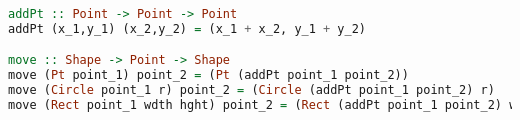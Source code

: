 \begin{lstlisting}[language=haskell]
addPt :: Point -> Point -> Point
addPt (x_1,y_1) (x_2,y_2) = (x_1 + x_2, y_1 + y_2)

move :: Shape -> Point -> Shape
move (Pt point_1) point_2 = (Pt (addPt point_1 point_2)) 
move (Circle point_1 r) point_2 = (Circle (addPt point_1 point_2) r) 
move (Rect point_1 wdth hght) point_2 = (Rect (addPt point_1 point_2) wdth hght)
\end{lstlisting}